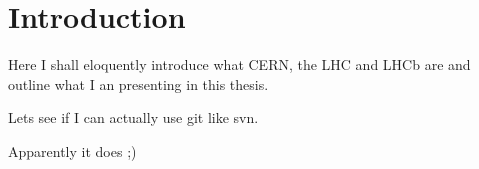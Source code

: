 \chapter{Introduction}

Here I shall eloquently introduce what CERN, the LHC and LHCb are and outline what I an presenting in this thesis.

Lets see if I can actually use git like svn.

Apparently it does ;)
